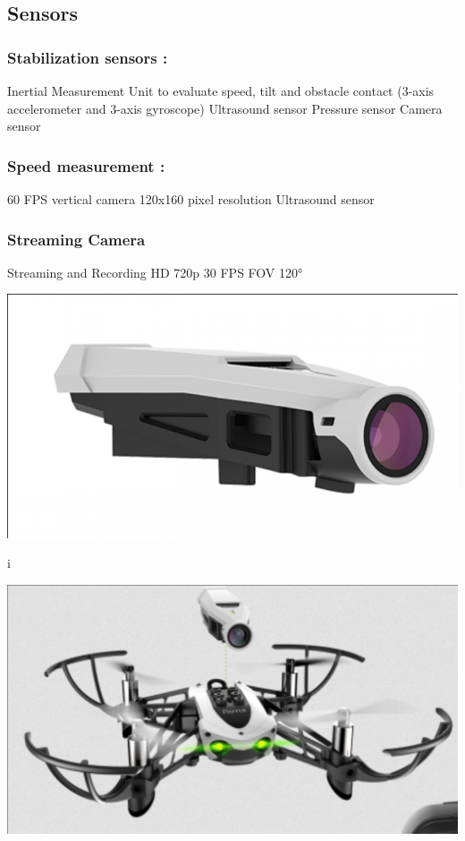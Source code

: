 \documentclass[11pt]{article}
\begin{document}
\subsection{Sensors}
\label{sec:org870641d}
\subsubsection{Stabilization sensors :}
\label{sec:org2df710e}
Inertial Measurement Unit to evaluate speed, tilt and obstacle contact (3-axis accelerometer and 3-axis gyroscope)
Ultrasound sensor
Pressure sensor
Camera sensor

\subsubsection{Speed measurement :}
\label{sec:org78cc47d}
60 FPS vertical camera
120x160 pixel resolution
Ultrasound sensor

\subsubsection{Streaming Camera}
\label{sec:org6a1847e}
Streaming and Recording HD 720p 30 FPS
FOV 120°
\begin{center}
\includegraphics[width=.9\linewidth]{./images/screenshot-02.png}
\end{center}i

\begin{center}
\includegraphics[width=.9\linewidth]{./images/screenshot-03.png}
\end{center}
\end{document}
